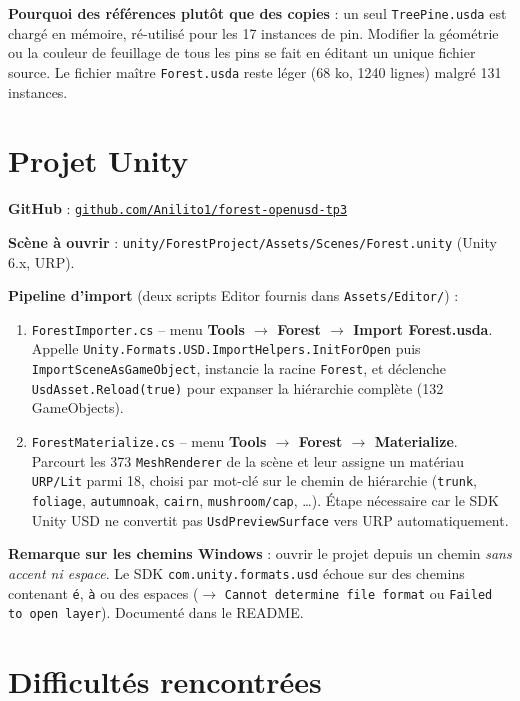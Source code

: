\documentclass[11pt,a4paper]{article}
\begin{document}
\textbf{Pourquoi des références plutôt que des copies} : un seul \texttt{TreePine.usda} est chargé en mémoire, ré-utilisé pour les 17 instances de pin. Modifier la géométrie ou la couleur de feuillage de tous les pins se fait en éditant un unique fichier source. Le fichier maître \texttt{Forest.usda} reste léger (68 ko, 1240 lignes) malgré 131 instances.

\section{Projet Unity}

\textbf{GitHub} : \href{https://github.com/Anilito1/forest-openusd-tp3}{\texttt{github.com/Anilito1/forest-openusd-tp3}}

\textbf{Scène à ouvrir} : \texttt{unity/ForestProject/Assets/Scenes/Forest.unity} (Unity 6.x, URP).

\textbf{Pipeline d'import} (deux scripts Editor fournis dans \texttt{Assets/Editor/}) :

\begin{enumerate}
  \item \texttt{ForestImporter.cs} -- menu \textbf{Tools $\rightarrow$ Forest $\rightarrow$ Import Forest.usda}. Appelle \texttt{Unity.Formats.USD.ImportHelpers.InitForOpen} puis \texttt{ImportSceneAsGameObject}, instancie la racine \texttt{Forest}, et déclenche \texttt{UsdAsset.Reload(true)} pour expanser la hiérarchie complète (132 GameObjects).
  \item \texttt{ForestMaterialize.cs} -- menu \textbf{Tools $\rightarrow$ Forest $\rightarrow$ Materialize}. Parcourt les 373 \texttt{MeshRenderer} de la scène et leur assigne un matériau \texttt{URP/Lit} parmi 18, choisi par mot-clé sur le chemin de hiérarchie (\texttt{trunk}, \texttt{foliage}, \texttt{autumnoak}, \texttt{cairn}, \texttt{mushroom/cap}, \ldots). Étape nécessaire car le SDK Unity USD ne convertit pas \texttt{UsdPreviewSurface} vers URP automatiquement.
\end{enumerate}

\textbf{Remarque sur les chemins Windows} : ouvrir le projet depuis un chemin \emph{sans accent ni espace}. Le SDK \texttt{com.unity.formats.usd} échoue sur des chemins contenant \texttt{é}, \texttt{à} ou des espaces ($\rightarrow$ \texttt{Cannot determine file format} ou \texttt{Failed to open layer}). Documenté dans le README.

\section{Difficultés rencontrées}
\end{document}

